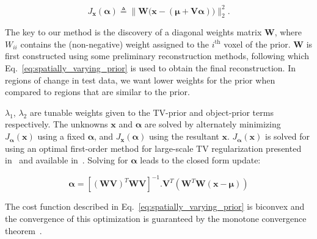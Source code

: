 \documentclass[journal]{IEEEtran}
\def\x{{\mathbf x}}
\begin{document}
\begin{equation}
J_{\boldsymbol{x}}(\boldsymbol{\alpha}) \triangleq \lVert\boldsymbol{\boldsymbol{W}(\boldsymbol{x}} - (\boldsymbol{\mu + V\alpha}))\rVert_2^2.
\end{equation}

The key to our method is the discovery of a diagonal weights matrix
$\boldsymbol{W}$, where $W_{ii}$ contains the (non-negative) weight
assigned to the $i^{\textrm{th}}$ voxel of the prior. $\boldsymbol{W}$
is first constructed using some preliminary reconstruction methods,
following which Eq.~\ref{eq:spatially_varying_prior} is used to obtain
the final reconstruction. In regions of change in test data, we want
lower weights for the prior when compared to regions that are similar
to the prior.

$\lambda_1$, $\lambda_2$ are tunable weights given to the
TV-prior and object-prior terms respectively. The unknowns
$\boldsymbol{\x}$ and $\boldsymbol{\alpha}$ are solved by alternately
minimizing $J_{\boldsymbol{\alpha}}(\boldsymbol{\x})$ using a fixed
$\boldsymbol{\alpha}$, and $J_{\boldsymbol{x}}(\boldsymbol{\alpha})$
using the resultant $\boldsymbol{\x}$.
$J_{\boldsymbol{\alpha}}(\boldsymbol{\x})$ is solved for using an
optimal first-order method for large-scale TV regularization presented
in~\cite{TVReg} and available in~\cite{TVReg-lib}.
Solving for $\boldsymbol{\alpha}$ leads to the closed form update:

\begin{equation}
\boldsymbol{\alpha} = [(\boldsymbol{WV})^T\boldsymbol{WV}]^{-1}.\boldsymbol{V}^T(\boldsymbol{W}^T\boldsymbol{W}(\boldsymbol{x} - \boldsymbol{\mu}))
\end{equation}

The cost function described in Eq.~\ref{eq:spatially_varying_prior} is biconvex and the convergence of this optimization is guaranteed by the monotone convergence theorem~\cite{monotone}.
\end{document}
